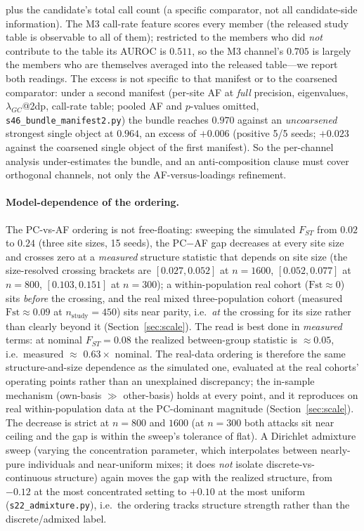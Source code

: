\documentclass[11pt]{article}
\begin{document}
plus the candidate's total call count (a specific comparator, not all
candidate-side information).
The M3 call-rate feature scores every member (the released study table is
observable to all of them); restricted to the members who did \emph{not}
contribute to the table its AUROC is $0.511$, so the M3 channel's $0.705$ is
largely the members who are themselves averaged into the released table---we
report both readings.
The excess is not specific to that manifest or to the coarsened comparator:
under a second manifest (per-site AF at \emph{full} precision, eigenvalues,
$\lambda_{GC}$@2dp, call-rate table; pooled AF and $p$-values omitted,
\texttt{s46\_bundle\_manifest2.py}) the bundle reaches $0.970$ against an
\emph{uncoarsened} strongest single object at $0.964$, an excess of $+0.006$
(positive 5/5 seeds; $+0.023$ against the coarsened single object of the first
manifest). So the per-channel analysis under-estimates the bundle, and an
anti-composition clause must cover orthogonal channels, not only the
AF-versus-loadings refinement.

\paragraph{Model-dependence of the ordering.} The PC-vs-AF ordering is not
free-floating: sweeping the simulated $F_{ST}$ from $0.02$ to $0.24$ (three site
sizes, 15 seeds), the PC$-$AF gap decreases at every site
size and crosses zero at a \emph{measured} structure statistic that depends on
site size (the size-resolved crossing brackets are $[0.027,0.052]$ at
$n{=}1600$, $[0.052,0.077]$ at $n{=}800$, $[0.103,0.151]$ at $n{=}300$); a
within-population real cohort ($\text{Fst}\approx0$) sits \emph{before} the
crossing, and the real mixed three-population cohort (measured
$\text{Fst}\approx0.09$ at $n_{\text{study}}{=}450$) sits near parity, i.e.\
\emph{at} the crossing for its size rather than clearly beyond it
(Section~\ref{sec:scale}). The
read is best done in \emph{measured} terms: at nominal $F_{ST}{=}0.08$ the
realized between-group statistic is ${\approx}0.05$, i.e.\ measured $\approx$
$0.63\times$ nominal. The real-data ordering is therefore the same
structure-and-size dependence as the simulated one, evaluated at the real
cohorts' operating points rather than an unexplained discrepancy; the in-sample
mechanism (own-basis $\gg$ other-basis) holds at every point, and it reproduces
on real within-population data at the PC-dominant magnitude
(Section~\ref{sec:scale}). The
decrease is strict at $n{=}800$ and $1600$ (at $n{=}300$ both attacks sit near
ceiling and the gap is within the sweep's tolerance of flat). A Dirichlet
admixture sweep (varying the concentration parameter, which interpolates between
nearly-pure individuals and near-uniform mixes; it does \emph{not} isolate
discrete-vs-continuous structure) again moves the gap with the realized
structure, from $-0.12$ at the most concentrated setting to $+0.10$ at the most
uniform (\texttt{s22\_admixture.py}), i.e.\ the ordering tracks structure
strength rather than the discrete/admixed label.
\end{document}
